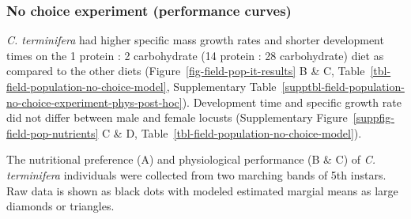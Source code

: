 \documentclass[
]{article}
\begin{document}
\subsubsection{No choice experiment (performance
curves)}\label{no-choice-experiment-performance-curves}

\emph{C. terminifera} had higher specific mass growth rates and shorter
development times on the 1 protein : 2 carbohydrate (14 protein : 28
carbohydrate) diet as compared to the other diets
(Figure~\ref{fig-field-pop-it-results} B \& C,
Table~\ref{tbl-field-population-no-choice-model},
Supplementary Table~\ref{supptbl-field-population-no-choice-experiment-phys-post-hoc}).
Development time and specific growth rate did not differ between male
and female locusts
(Supplementary Figure~\ref{suppfig-field-pop-nutrients} C \& D,
Table~\ref{tbl-field-population-no-choice-model}).

\begin{fig}


\caption{\label{fig-field-pop-it-results}The nutritional preference (A)
and physiological performance (B \& C) of \emph{C. terminifera}
individuals were collected from two marching bands of 5th instars. Raw
data is shown as black dots with modeled estimated margial means as
large diamonds or triangles.}

\end{fig}%
\end{document}
